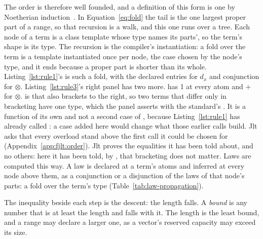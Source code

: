 \begin{itemize}
The order is therefore well founded, and a definition of this form is one by Noetherian induction~\cite[III, \S 6.5]{bourbaki1968theoryofsets}.
In Equation~\eqref{eq:fold} the tail is the one largest proper part of a range, so that recursion is a walk, and this one runs over a tree.
Each node of a term is a class template whose type names its parts', so the term's shape is its type.
The recursion is the compiler's instantiation: a fold over the term is a template instantiated once per node, the case chosen by the node's type, and it ends because a proper part is shorter than its whole.
Listing~\ref{lst:rule1}'s  is such a fold, with the declared entries for $d_x$ and conjunction for $\otimes$.
Listing~\ref{lst:rule3}'s right panel has two more.
 has 1 at every atom and $+$ for $\otimes$.
 is \cppinline{>>} that also brackets to the right, so two terms that differ only in bracketing have one type, which the panel asserts with the standard's .
It is a function of its own and not a second case of \cppinline{>>}, because Listing~\ref{lst:rule1} has already called \cppinline{>>}: a case added here would change what those earlier calls build.
Jlt asks that every overload stand above the first call it could be chosen for (Appendix~\ref{app:fjlt:order}).
Jlt proves the equalities it has been told about, and no others: here it has been told, by , that bracketing does not matter.
Laws are computed this way.
A law is declared at a term's atoms and inferred at every node above them, as a conjunction or a disjunction of the laws of that node's parts: a fold over the term's type (Table~\ref{tab:law-propagation}).
\end{itemize}
The inequality beside each step is the descent: the length falls.
A \emph{bound} is any number that is at least the length and falls with it.
The length is the least bound, and a range may declare a larger one, as a vector's reserved capacity may exceed its size.


